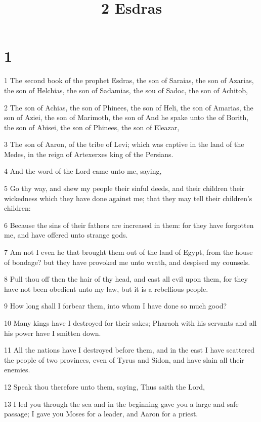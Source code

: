 

\title{2 Esdras}

\chapter{1}

\par 1 The second book of the prophet Esdras, the son of Saraias, the son of Azarias, the son of Helchias, the son of Sadamias, the sou of Sadoc, the son of Achitob,
\par 2 The son of Achias, the son of Phinees, the son of Heli, the son of Amarias, the son of Aziei, the son of Marimoth, the son of And he spake unto the of Borith, the son of Abisei, the son of Phinees, the son of Eleazar,
\par 3 The son of Aaron, of the tribe of Levi; which was captive in the land of the Medes, in the reign of Artexerxes king of the Persians.
\par 4 And the word of the Lord came unto me, saying,
\par 5 Go thy way, and shew my people their sinful deeds, and their children their wickedness which they have done against me; that they may tell their children's children:
\par 6 Because the sins of their fathers are increased in them: for they have forgotten me, and have offered unto strange gods.
\par 7 Am not I even he that brought them out of the land of Egypt, from the house of bondage? but they have provoked me unto wrath, and despised my counsels.
\par 8 Pull thou off then the hair of thy head, and cast all evil upon them, for they have not been obedient unto my law, but it is a rebellious people.
\par 9 How long shall I forbear them, into whom I have done so much good?
\par 10 Many kings have I destroyed for their sakes; Pharaoh with his servants and all his power have I smitten down.
\par 11 All the nations have I destroyed before them, and in the east I have scattered the people of two provinces, even of Tyrus and Sidon, and have slain all their enemies.
\par 12 Speak thou therefore unto them, saying, Thus saith the Lord,
\par 13 I led you through the sea and in the beginning gave you a large and safe passage; I gave you Moses for a leader, and Aaron for a priest.
